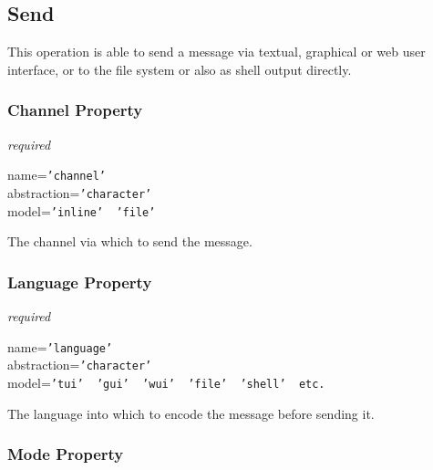 %
%
%
%
%
%

\subsection{Send}
\label{send_heading}

This operation is able to send a message via textual, graphical or web user
interface, or to the file system or also as shell output directly.

\subsubsection{Channel Property}

\emph{required}

name=\texttt{'channel'}\\
abstraction=\texttt{'character'}\\
model=\texttt{'inline' \vline\ 'file'}

The channel via which to send the message.

\subsubsection{Language Property}

\emph{required}

name=\texttt{'language'}\\
abstraction=\texttt{'character'}\\
model=\texttt{'tui' \vline\ 'gui' \vline\ 'wui' \vline\ 'file' \vline\ 'shell' \vline\ etc.}

The language into which to encode the message before sending it.

\subsubsection{Mode Property}

